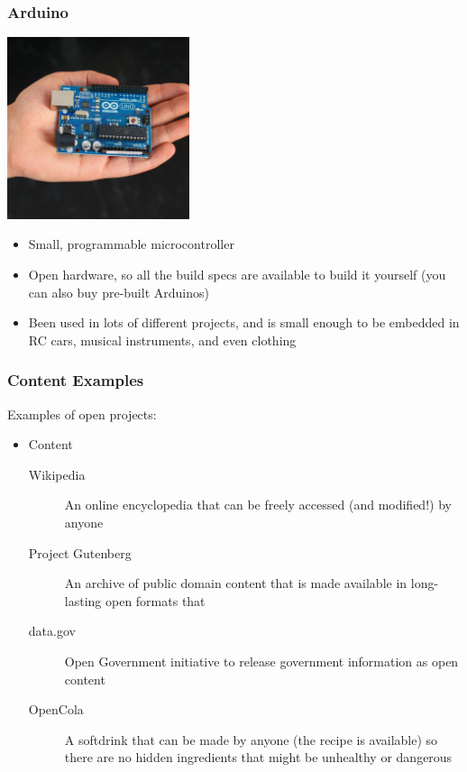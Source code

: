 \documentclass{beamer}
\begin{document}

\begin{frame}
  \frametitle{Arduino}
  \begin{center} \includegraphics[width=0.4\textwidth]{img/arduino} \end{center}
  \begin{itemize}
  \item Small, programmable \textcolor{beamer@myblue}{microcontroller}
  \item Open hardware, so all the build specs are available to build
    it yourself (you can also buy pre-built Arduinos)
  \item Been used in lots of different projects, and is small enough to be embedded in RC cars, musical instruments, and even clothing
  \end{itemize}
\end{frame}


\begin{frame}
  \frametitle{Content Examples}
  Examples of open projects:
  \begin{itemize}
  \item Content
    \begin{description}
    \item[Wikipedia] An online encyclopedia that can be freely accessed (and modified!) by anyone
    \item[Project Gutenberg] An archive of public domain content that is made available in long-lasting open formats that
    \item[data.gov] Open Government initiative to release government information as open content
    \item[OpenCola] A softdrink that can be made by anyone (the recipe
      is available) so there are no hidden ingredients that might be
      unhealthy or dangerous
    \end{description}
  \end{itemize}
\end{frame}
\end{document}
